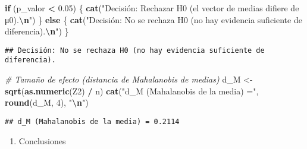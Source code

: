 \documentclass[
]{article}
\newenvironment{Shaded}{\begin{snugshade}}{\end{snugshade}}
\newcommand{\CommentTok}[1]{\textcolor[rgb]{0.56,0.35,0.01}{\textit{#1}}}
\newcommand{\ControlFlowTok}[1]{\textcolor[rgb]{0.13,0.29,0.53}{\textbf{#1}}}
\newcommand{\DecValTok}[1]{\textcolor[rgb]{0.00,0.00,0.81}{#1}}
\newcommand{\FloatTok}[1]{\textcolor[rgb]{0.00,0.00,0.81}{#1}}
\newcommand{\FunctionTok}[1]{\textcolor[rgb]{0.13,0.29,0.53}{\textbf{#1}}}
\newcommand{\NormalTok}[1]{#1}
\newcommand{\OtherTok}[1]{\textcolor[rgb]{0.56,0.35,0.01}{#1}}
\newcommand{\SpecialCharTok}[1]{\textcolor[rgb]{0.81,0.36,0.00}{\textbf{#1}}}
\newcommand{\StringTok}[1]{\textcolor[rgb]{0.31,0.60,0.02}{#1}}
\providecommand{\tightlist}{%
  \setlength{\itemsep}{0pt}\setlength{\parskip}{0pt}}
\begin{document}
\begin{Shaded}
\begin{Highlighting}[]
\ControlFlowTok{if}\NormalTok{ (p\_valor }\SpecialCharTok{\textless{}} \FloatTok{0.05}\NormalTok{) \{}
  \FunctionTok{cat}\NormalTok{(}\StringTok{"Decisión: Rechazar H0 (el vector de medias difiere de μ0).}\SpecialCharTok{\textbackslash{}n}\StringTok{"}\NormalTok{)}
\NormalTok{\} }\ControlFlowTok{else}\NormalTok{ \{}
  \FunctionTok{cat}\NormalTok{(}\StringTok{"Decisión: No se rechaza H0 (no hay evidencia suficiente de diferencia).}\SpecialCharTok{\textbackslash{}n}\StringTok{"}\NormalTok{)}
\NormalTok{\}}
\end{Highlighting}
\end{Shaded}

\begin{verbatim}
## Decisión: No se rechaza H0 (no hay evidencia suficiente de diferencia).
\end{verbatim}

\begin{Shaded}
\begin{Highlighting}[]
\CommentTok{\# Tamaño de efecto (distancia de Mahalanobis de medias)}
\NormalTok{d\_M }\OtherTok{\textless{}{-}} \FunctionTok{sqrt}\NormalTok{(}\FunctionTok{as.numeric}\NormalTok{(Z2) }\SpecialCharTok{/}\NormalTok{ n)}
\FunctionTok{cat}\NormalTok{(}\StringTok{"d\_M (Mahalanobis de la media) ="}\NormalTok{, }\FunctionTok{round}\NormalTok{(d\_M, }\DecValTok{4}\NormalTok{), }\StringTok{"}\SpecialCharTok{\textbackslash{}n}\StringTok{"}\NormalTok{)}
\end{Highlighting}
\end{Shaded}

\begin{verbatim}
## d_M (Mahalanobis de la media) = 0.2114
\end{verbatim}

\begin{enumerate}
\def\labelenumi{\arabic{enumi})}
\setcounter{enumi}{4}
\tightlist
\item
  Conclusiones
\end{enumerate}
\end{document}
